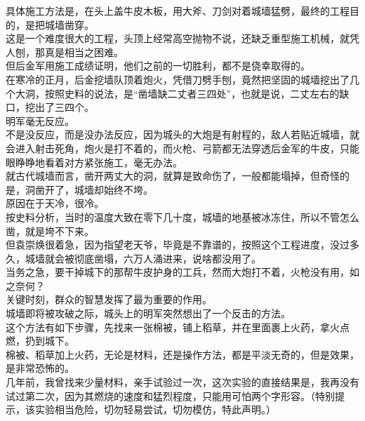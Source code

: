 \begin{multicols}{\theparacolNo}
具体施工方法是，在头上盖牛皮木板，用大斧、刀剑对着城墙猛劈，最终的工程目的，是把城墙凿穿。\\

这是一个难度很大的工程，头顶上经常高空抛物不说，还缺乏重型施工机械，就凭人刨，那真是相当之困难。\\

但后金军用施工成绩证明，他们之前的一切胜利，都不是侥幸取得的。\\

在寒冷的正月，后金挖墙队顶着炮火，凭借刀劈手刨，竟然把坚固的城墙挖出了几个大洞，按照史料的说法，是“凿墙缺二丈者三四处”，也就是说，二丈左右的缺口，挖出了三四个。\\

明军毫无反应。\\

不是没反应，而是没办法反应，因为城头的大炮是有射程的，敌人若贴近城墙，就会进入射击死角，炮火是打不着的，而火枪、弓箭都无法穿透后金军的牛皮，只能眼睁睁地看着对方紧张施工，毫无办法。\\

就古代城墙而言，凿开两丈大的洞，就算是致命伤了，一般都能塌掉，但奇怪的是，洞凿开了，城墙却始终不垮。\\

原因在于天冷，很冷。\\

按史料分析，当时的温度大致在零下几十度，城墙的地基被冰冻住，所以不管怎么凿，就是垮不下来。\\

但袁崇焕很着急，因为指望老天爷，毕竟是不靠谱的，按照这个工程进度，没过多久，城墙就会被彻底凿塌，六万人涌进来，说啥都没用了。\\

当务之急，要干掉城下的那帮牛皮护身的工兵，然而大炮打不着，火枪没有用，如之奈何？\\

关键时刻，群众的智慧发挥了最为重要的作用。\\

城墙即将被攻破之际，城头上的明军突然想出了一个反击的方法。\\

这个方法有如下步骤，先找来一张棉被，铺上稻草，并在里面裹上火药，拿火点燃，扔到城下。\\

棉被、稻草加上火药，无论是材料，还是操作方法，都是平淡无奇的，但是效果，是非常恐怖的。\\

几年前，我曾找来少量材料，亲手试验过一次，这次实验的直接结果是，我再没有试过第二次，因为其燃烧的速度和猛烈程度，只能用可怕两个字形容。（特别提示，该实验相当危险，切勿轻易尝试，切勿模仿，特此声明。）\\


\end{multicols}
